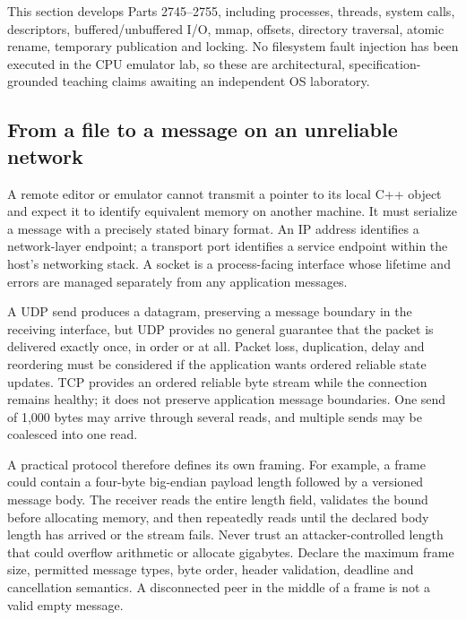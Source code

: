 This section develops Parts 2745--2755, including processes, threads, system calls, descriptors, buffered/unbuffered I/O, mmap, offsets, directory traversal, atomic rename, temporary publication and locking. No filesystem fault injection has been executed in the CPU emulator lab, so these are architectural, specification-grounded teaching claims awaiting an independent OS laboratory.

\subsection{From a file to a message on an unreliable network}\label{06-engine-ii-ch042-from-a-file-to-a-message-on-an-unreliable-network}

\hypertarget{06-engine-ii-ch042-from-a-file-to-a-message-on-an-unreliable-network}{}

A remote editor or emulator cannot transmit a pointer to its local C++ object and expect it to identify equivalent memory on another machine. It must serialize a message with a precisely stated binary format. An IP address identifies a network-layer endpoint; a transport port identifies a service endpoint within the host's networking stack. A socket is a process-facing interface whose lifetime and errors are managed separately from any application messages.

A UDP send produces a datagram, preserving a message boundary in the receiving interface, but UDP provides no general guarantee that the packet is delivered exactly once, in order or at all. Packet loss, duplication, delay and reordering must be considered if the application wants ordered reliable state updates. TCP provides an ordered reliable byte stream while the connection remains healthy; it does not preserve application message boundaries. One send of 1,000 bytes may arrive through several reads, and multiple sends may be coalesced into one read.

A practical protocol therefore defines its own framing. For example, a frame could contain a four-byte big-endian payload length followed by a versioned message body. The receiver reads the entire length field, validates the bound before allocating memory, and then repeatedly reads until the declared body length has arrived or the stream fails. Never trust an attacker-controlled length that could overflow arithmetic or allocate gigabytes. Declare the maximum frame size, permitted message types, byte order, header validation, deadline and cancellation semantics. A disconnected peer in the middle of a frame is not a valid empty message.

